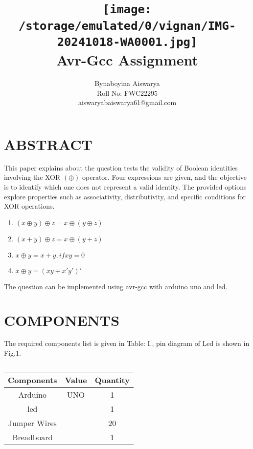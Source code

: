 \documentclass[conference]{IEEEtran}
\title{
\vspace{1cm}
{\texttt{[image:  /storage/emulated/0/vignan/IMG-20241018-WA0001.jpg]} \\ Avr-Gcc Assignment}}
\author{Bynaboyina Aiswarya \\ Roll No: FWC22295 \\ aiswaryabaiswarya61@gmail.com}
\begin{document}
\maketitle
 \section{ABSTRACT}

 This paper explains about the question tests the validity of Boolean identities involving the XOR $(\oplus)$ operator. Four expressions are given, and the objective is to identify which one does not represent a valid identity. The provided options explore properties such as associativity, distributivity, and specific conditions for XOR operations.
\begin{enumerate}
\item  $(x \oplus y) \oplus
 z = x  \oplus (y \oplus z) $ 
\item  $(x + y)  \oplus z = x  \oplus
  (y + z)$
\item  $ x \oplus y = x + y, if xy=0 $
\item  $ x \oplus y = ( xy +x'y' )' $
\end{enumerate}
The question can be implemented using avr-gcc with arduino uno and led.

\section{COMPONENTS} 

The required components list is given in Table: I., pin diagram of Led is shown in Fig.1.
\vspace{0.1cm}
 \begin{table} [htbp]
\centering
\begin{tabular}{| c | c | c |} \hline
Components & Value & Quantity \\\hline
Arduino & UNO & 1 \\ \hline
led &  & 1 \\ \hline
Jumper Wires &  & 20 \\ \hline
Breadboard & & 1 \\ 
\hline
\end{tabular}
\vspace{0.1cm}
\caption{\label{tab:widgets}}
\end{table}
\end{document}
